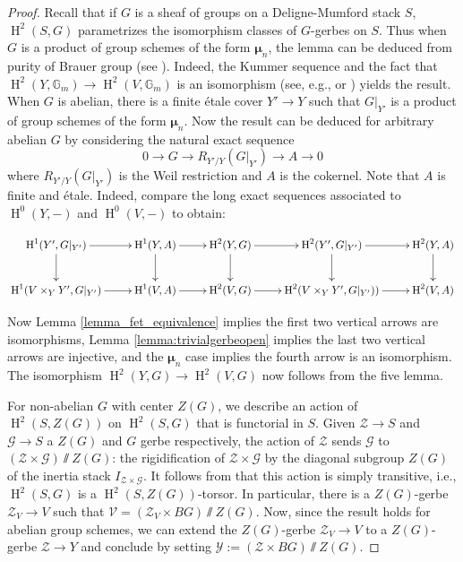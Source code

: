 \documentclass{amsart}
\newcommand{\oH}{\operatorname{H}}
\newcommand{\cG}{\mathcal{G}}
\newcommand{\cV}{\mathcal{V}}
\newcommand{\cY}{\mathcal{Y}}
\newcommand{\cZ}{\mathcal{Z}}
\newcommand{\bmu}{\bm{\mu}}
\theoremstyle{definition}
\begin{document}
    \begin{proof} Recall that if $G$ is a sheaf of groups on a Deligne-Mumford stack $S$, $\oH^2(S,G)$ parametrizes the isomorphism classes of $G$-gerbes on $S$. Thus when $G$ is a product of group schemes of the form $\bmu_n$, the lemma can be deduced from purity of Brauer group (see \cite[Thm. 1.1]{zbMATH07080116}). Indeed, the Kummer sequence and the fact that $\oH^2(Y,\mathbb{G}_m) \to \oH^2(V,\mathbb{G}_m)$ is an isomorphism (see, e.g., \cite[Prop. 2]{MR3521088} or \cite{344258}) yields the result. When $G$ is abelian, there is a finite \'etale cover $Y' \to Y$ such that $G|_{Y'}$ is a product of group schemes of the form $\bmu_n$. Now the result can be deduced for arbitrary abelian $G$ by considering the natural exact sequence
    \[0 \to G \to R_{Y'/Y}(G|_{Y'}) \to A \to 0\]
    where $R_{Y'/Y}(G|_{Y'})$ is the Weil restriction and $A$ is the cokernel. Note that $A$ is finite and \'etale. Indeed, compare the long exact sequences associated to $\oH^0(Y,-)$ and $\oH^0(V,-)$ to obtain:

    $$\xymatrix{ \oH^1(Y',G|_{Y'})\ar[d]\ar[r]&\oH^1(Y,A)\ar[d]\ar[r] & \oH^2(Y,G)\ar[d]\ar[r] &\oH^2(Y',G|_{Y'})\ar[d]\ar[r] & \oH^2(Y,A)\ar[d] \\
    \oH^1(V \times_Y Y',G|_{Y'})\ar[r]&\oH^1(V,A)\ar[r] & \oH^2(V,G)\ar[r] &\oH^2(V \times_Y Y',G|_{Y'}))\ar[r] & \oH^2(V,A) }$$

    Now Lemma \ref{lemma_fet_equivalence} implies the first two vertical arrows are isomorphisms, Lemma \ref{lemma:trivialgerbeopen} implies the last two vertical arrows are injective, and the $\bmu_n$ case implies the fourth arrow is an isomorphism. The isomorphism $\oH^2(Y,G) \to \oH^2(V,G)$ now follows from the five lemma. 
    
    For non-abelian $G$ with center $Z(G)$, we describe an action of $\oH^2(S,Z(G))$ on $\oH^2(S,G)$ that is functorial in $S$. Given $\cZ\to S$ and $\cG\to S$ a $Z(G)$ and $G$ gerbe respectively, the action of $\cZ$ sends $\cG$ to $(\cZ\times \cG)\sslash Z(G)$: the rigidification of $\cZ\times \cG$ by the diagonal subgroup $Z(G)$ of the inertia stack $I_{\cZ \times \cG}$. It follows from \cite[Thm. 3.3.3]{giraud} that this action is simply transitive, i.e., $\oH^2(S,G)$ is a $\oH^2(S,Z(G))$-torsor. In particular, there is a $Z(G)$-gerbe $\cZ_V\to V$ such that $\cV = (\cZ_V\times BG)\sslash Z(G).$ Now, since the result holds for abelian group schemes, we can extend the $Z(G)$-gerbe $\cZ_V\to V$ to a $Z(G)$-gerbe $\cZ\to Y$ and conclude by setting $\cY:=(\cZ\times BG)\sslash Z(G).$\end{proof}
\end{document}
